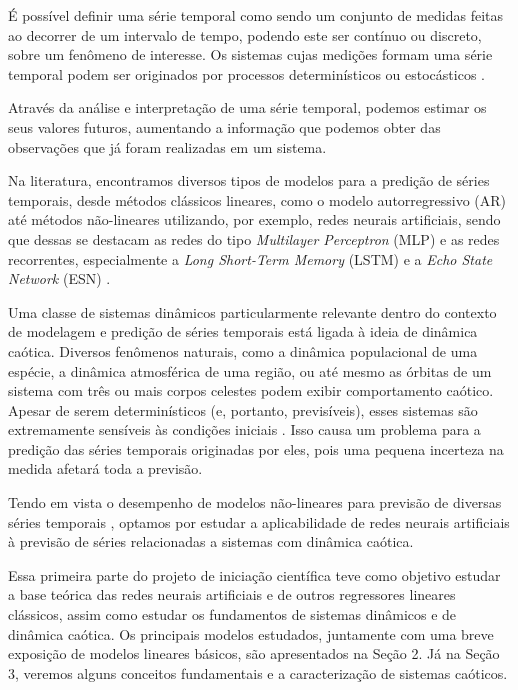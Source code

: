 \documentclass[a4paper, 12pt]{article}
\begin{document}
É possível definir uma série temporal como sendo um conjunto de medidas feitas ao decorrer de um intervalo de tempo, podendo este ser contínuo ou discreto, sobre um fenômeno de interesse. Os sistemas cujas medições formam uma série temporal podem ser originados por processos determinísticos ou estocásticos \cite{box2015time}.

Através da análise e interpretação de uma série temporal, podemos estimar os seus valores futuros, aumentando a informação que podemos obter das observações que já foram realizadas em um sistema.

Na literatura, encontramos diversos tipos de modelos para a  predição de séries temporais, desde métodos clássicos lineares, como o modelo autorregressivo (AR) \cite{box2015time} até métodos não-lineares utilizando, por exemplo, redes neurais artificiais, sendo que dessas se destacam as redes do tipo \textit{Multilayer Perceptron} (MLP) e as redes recorrentes, especialmente a \textit{Long Short-Term Memory} (LSTM)  \cite{connor1994recurrent} e a \textit{Echo State Network} (ESN) \cite{jaeger2007echo}.

Uma classe de sistemas dinâmicos particularmente relevante dentro do contexto de modelagem e predição de séries temporais está ligada à ideia de dinâmica caótica. Diversos fenômenos naturais, como a dinâmica populacional de uma espécie, a dinâmica atmosférica de uma região, ou até mesmo as órbitas de um sistema com três ou mais corpos celestes podem exibir comportamento caótico. Apesar de serem determinísticos (e, portanto, previsíveis), esses sistemas são extremamente sensíveis às condições iniciais \cite{fiedler1994caos}. Isso causa um problema para a predição das séries temporais originadas por eles, pois uma pequena incerteza na medida afetará toda a previsão. 

Tendo em vista o desempenho de modelos não-lineares para previsão de diversas séries temporais \cite{connor1994recurrent}, optamos por estudar a aplicabilidade de redes neurais artificiais à previsão de séries relacionadas a sistemas com dinâmica caótica.

Essa primeira parte do projeto de iniciação científica teve como objetivo estudar a base teórica das redes neurais artificiais e de outros regressores lineares clássicos, assim como estudar os fundamentos de sistemas dinâmicos e de dinâmica caótica. Os principais modelos estudados, juntamente com uma breve exposição de modelos lineares básicos, são apresentados na Seção 2. Já na Seção 3, veremos alguns conceitos fundamentais e a caracterização de sistemas caóticos.
\end{document}
